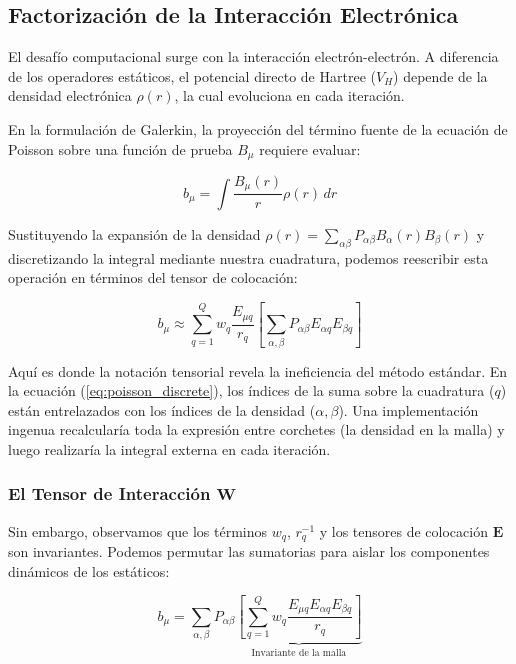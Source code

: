 \subsection{Factorización de la Interacción Electrónica}

El desafío computacional surge con la interacción electrón-electrón. A diferencia de los operadores estáticos, el potencial directo de Hartree (\( V_H \)) depende de la densidad electrónica \( \rho(r) \), la cual evoluciona en cada iteración.

En la formulación de Galerkin, la proyección del término fuente de la ecuación de Poisson sobre una función de prueba \( B_\mu \) requiere evaluar:

\begin{equation}
\label{eq:poisson_continuous}
b_\mu = \int \frac{B_\mu(r)}{r} \rho(r) \, dr
\end{equation}

Sustituyendo la expansión de la densidad \( \rho(r) = \sum_{\alpha \beta} P_{\alpha \beta} B_\alpha(r) B_\beta(r) \) y discretizando la integral mediante nuestra cuadratura, podemos reescribir esta operación en términos del tensor de colocación:

\begin{equation}
\label{eq:poisson_discrete}
b_\mu \approx \sum_{q=1}^Q w_q \frac{E_{\mu q}}{r_q} \left[ \sum_{\alpha, \beta} P_{\alpha \beta} E_{\alpha q} E_{\beta q} \right]
\end{equation}

Aquí es donde la notación tensorial revela la ineficiencia del método estándar. En la ecuación (\ref{eq:poisson_discrete}), los índices de la suma sobre la cuadratura (\( q \)) están entrelazados con los índices de la densidad (\( \alpha, \beta \)). Una implementación ingenua recalcularía toda la expresión entre corchetes (la densidad en la malla) y luego realizaría la integral externa en cada iteración.

\subsubsection{El Tensor de Interacción \( \mathbf{W} \)}

Sin embargo, observamos que los términos \( w_q \), \( r_q^{-1} \) y los tensores de colocación \( \bm{E} \) son invariantes. Podemos permutar las sumatorias para aislar los componentes dinámicos de los estáticos:

\begin{equation}
b_\mu = \sum_{\alpha, \beta} P_{\alpha \beta} \underbrace{ \left[ \sum_{q=1}^Q w_q \frac{E_{\mu q} E_{\alpha q} E_{\beta q}}{r_q} \right] }_{\text{Invariante de la malla}}
\end{equation}

